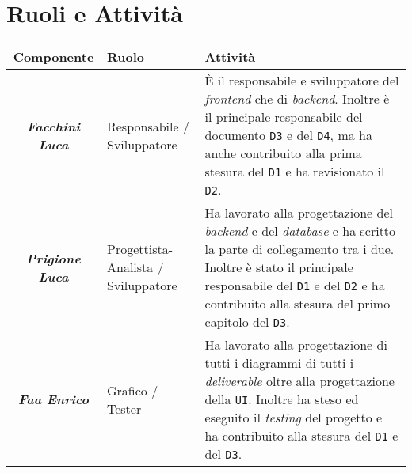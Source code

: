 \chapter{Ruoli e Attività}
\begin{table}[H]
    \centering
    \begin{tabular}{|c|p{10em}|p{24em}|}
        \hline
        \textbf{Componente} & \textbf{Ruolo} & \textbf{Attività} \\
        \hline 
        \textbf{\textit{Facchini Luca}} & Responsabile / Sviluppatore & È il responsabile e sviluppatore del \textit{frontend} che di \textit{backend}. Inoltre è il principale responsabile del documento \texttt{D3} e del \texttt{D4}, ma ha anche contribuito alla prima stesura del \texttt{D1} e ha revisionato il \texttt{D2}. \\
        \hline
        \textbf{\textit{Prigione Luca}} & Progettista-Analista / Sviluppatore & Ha lavorato alla progettazione del \textit{backend} e del \textit{database} e ha scritto la parte di collegamento tra i due. Inoltre è stato il principale responsabile del \texttt{D1} e del \texttt{D2} e ha contribuito alla stesura del primo capitolo del \texttt{D3}. \\
        \hline
        \textbf{\textit{Faa Enrico}} & Grafico / Tester & Ha lavorato alla progettazione di tutti i diagrammi di tutti i \textit{deliverable} oltre alla progettazione della \texttt{UI}. Inoltre ha steso ed eseguito il \textit{testing} del progetto e ha contribuito alla stesura del \texttt{D1} e del \texttt{D3}. \\
        \hline
    \end{tabular}
\end{table}